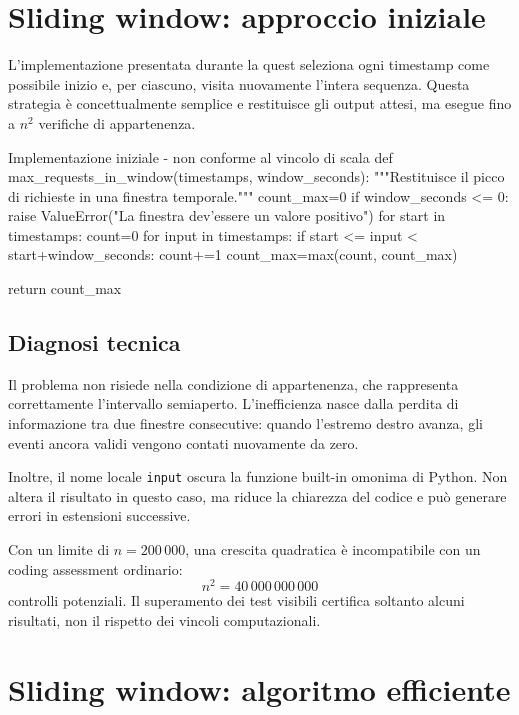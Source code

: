 \Needspace{14cm}
\section{Sliding window: approccio iniziale}

L'implementazione presentata durante la quest seleziona ogni timestamp come
possibile inizio e, per ciascuno, visita nuovamente l'intera sequenza. Questa
strategia è concettualmente semplice e restituisce gli output attesi, ma
esegue fino a $n^2$ verifiche di appartenenza.

\begin{inefficientcode}{Implementazione iniziale - non conforme al vincolo di scala}
def max_requests_in_window(timestamps, window_seconds):
    """Restituisce il picco di richieste in una finestra temporale."""
    count_max=0
    if window_seconds <= 0:
        raise ValueError("La finestra dev'essere un valore positivo")
    for start in timestamps:
        count=0
        for input in timestamps:
            if start <= input < start+window_seconds:
                count+=1
        count_max=max(count, count_max)

    return count_max
\end{inefficientcode}

\subsection{Diagnosi tecnica}

Il problema non risiede nella condizione di appartenenza, che rappresenta
correttamente l'intervallo semiaperto. L'inefficienza nasce dalla perdita di
informazione tra due finestre consecutive: quando l'estremo destro avanza,
gli eventi ancora validi vengono contati nuovamente da zero.

Inoltre, il nome locale \texttt{input} oscura la funzione built-in omonima di
Python. Non altera il risultato in questo caso, ma riduce la chiarezza del
codice e può generare errori in estensioni successive.

Con un limite di $n=200\,000$, una crescita quadratica è incompatibile con un
coding assessment ordinario:
\[
n^2 = 40\,000\,000\,000
\]
controlli potenziali. Il superamento dei test visibili certifica soltanto
alcuni risultati, non il rispetto dei vincoli computazionali.

\clearpage
\thispagestyle{fancy}
\noindent\rule{0pt}{1cm}\par
\section{Sliding window: algoritmo efficiente}

